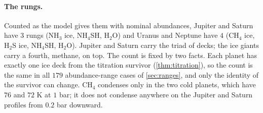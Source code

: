 \documentclass[11pt]{article}
\theoremstyle{definition}\newtheorem{definition}[theorem]{Definition}
\theoremstyle{remark}\newtheorem{remark}[theorem]{Remark}
\begin{document}
\paragraph{The rungs.} Counted as the model gives them with nominal abundances, Jupiter and Saturn have $3$ rungs (NH$_3$ ice, NH$_4$SH, H$_2$O) and Uranus and Neptune have $4$ (CH$_4$ ice, H$_2$S ice, NH$_4$SH, H$_2$O). Jupiter and Saturn carry the triad of decks; the ice giants carry a fourth, methane, on top. The count is fixed by two facts. Each planet has exactly one ice deck from the titration survivor (\cref{thm:titration}), so the count is the same in all $179$ abundance-range cases of \cref{sec:ranges}, and only the identity of the survivor can change. CH$_4$ condenses only in the two cold planets, which have $76$ and $72$ K at $1$ bar; it does not condense anywhere on the Jupiter and Saturn profiles from $0.2$ bar downward.
\end{document}
